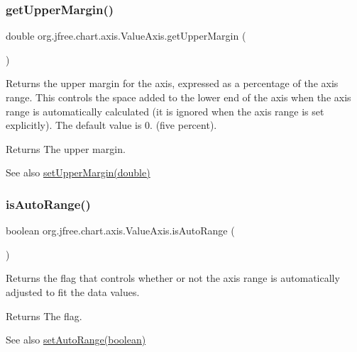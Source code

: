 \subsubsection{\texorpdfstring{get\+Upper\+Margin()}{getUpperMargin()}}
{\footnotesize\ttfamily double org.\+jfree.\+chart.\+axis.\+Value\+Axis.\+get\+Upper\+Margin (\begin{DoxyParamCaption}{ }\end{DoxyParamCaption})}

Returns the upper margin for the axis, expressed as a percentage of the axis range. This controls the space added to the lower end of the axis when the axis range is automatically calculated (it is ignored when the axis range is set explicitly). The default value is 0. (five percent).

\begin{DoxyReturn}{Returns}
The upper margin.
\end{DoxyReturn}
\begin{DoxySeeAlso}{See also}
\mbox{\hyperlink{classorg_1_1jfree_1_1chart_1_1axis_1_1_value_axis_a6ba839a843d27cf2f79a10a20dd98650}{set\+Upper\+Margin(double)}} 
\end{DoxySeeAlso}
\mbox{\label{classorg_1_1jfree_1_1chart_1_1axis_1_1_value_axis_a6387bb31d194a542d27329ae8e0e84b2}} 
\subsubsection{\texorpdfstring{is\+Auto\+Range()}{isAutoRange()}}
{\footnotesize\ttfamily boolean org.\+jfree.\+chart.\+axis.\+Value\+Axis.\+is\+Auto\+Range (\begin{DoxyParamCaption}{ }\end{DoxyParamCaption})}

Returns the flag that controls whether or not the axis range is automatically adjusted to fit the data values.

\begin{DoxyReturn}{Returns}
The flag.
\end{DoxyReturn}
\begin{DoxySeeAlso}{See also}
\mbox{\hyperlink{classorg_1_1jfree_1_1chart_1_1axis_1_1_value_axis_a2407eb22460d462c3eb730d5ddb10067}{set\+Auto\+Range(boolean)}} 
\end{DoxySeeAlso}
\mbox{\label{classorg_1_1jfree_1_1chart_1_1axis_1_1_value_axis_adc265a92cee6f4f50dcf0701f86d3cab}} 
